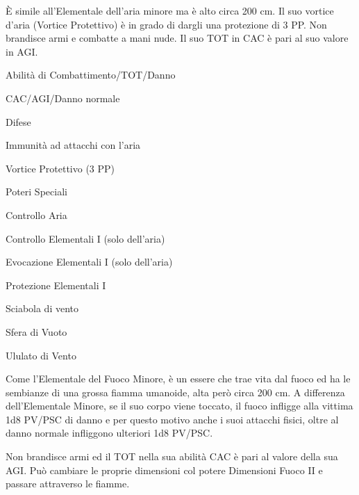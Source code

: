 
\`E simile all'Elementale dell'aria minore ma \`e alto circa 200 cm.
Il suo vortice d'aria (Vortice Protettivo) \`e in grado di dargli
una protezione di 3 PP. Non brandisce armi e combatte a mani nude. Il
suo TOT in CAC \`e pari al suo valore in AGI.


\begin{parmostro}{Abilit\`a di Combattimento/TOT/Danno}
\item CAC/AGI/Danno normale
\end{parmostro}

\begin{parmostro}{Difese} 
\item Immunit\`a ad attacchi con l'aria 
\item Vortice Protettivo (3 PP)
\end{parmostro}

\begin{parmostro}{Poteri Speciali} 
\item Controllo Aria
\item Controllo Elementali I (solo dell'aria)
\item Evocazione Elementali I (solo dell'aria)
\item Protezione Elementali I
\item Sciabola di vento
\item Sfera di Vuoto
\item Ululato di Vento
\end{parmostro}


Come l'Elementale del Fuoco Minore, \`e un essere che trae vita dal
fuoco ed ha le sembianze di una grossa fiamma umanoide, alta per\`o
circa 200 cm. A differenza dell'Elementale Minore, se il suo corpo
viene toccato, il fuoco infligge alla vittima 1d8 PV/PSC di danno e
per questo motivo anche i suoi attacchi fisici, oltre al danno normale
infliggono ulteriori 1d8 PV/PSC.


Non brandisce armi ed il TOT nella sua abilit\`a CAC \`e pari al
valore della sua AGI. Pu\`o cambiare le proprie dimensioni col
potere Dimensioni Fuoco II e passare attraverso le fiamme.


